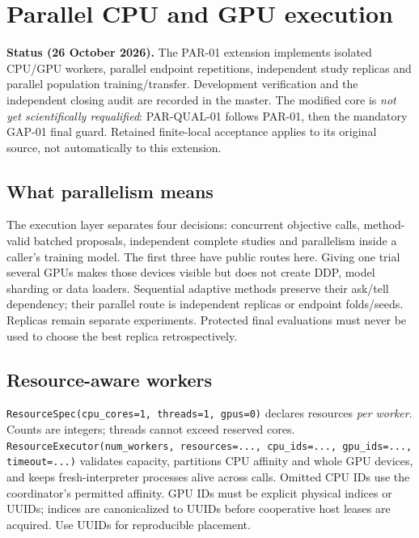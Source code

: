 \chapter{Parallel CPU and GPU execution}
\label{sec:parallel-extension}

\begin{decisions}
\textbf{Status (26 October 2026).} The PAR-01 extension implements isolated
CPU/GPU workers, parallel endpoint repetitions, independent study replicas and
parallel population training/transfer. Development verification and the
independent closing audit are recorded in the master. The modified core is
\emph{not yet scientifically requalified}: PAR-QUAL-01 follows PAR-01, then the
mandatory GAP-01 final guard. Retained finite-local acceptance applies to its
original source, not automatically to this extension.
\end{decisions}

\section{What parallelism means}
The execution layer separates four decisions: concurrent objective calls,
method-valid batched proposals, independent complete studies and parallelism
inside a caller's training model. The first three have public routes here.
Giving one trial several GPUs makes those devices visible but does not create
DDP, model sharding or data loaders. Sequential adaptive methods preserve their
ask/tell dependency; their parallel route is independent replicas or endpoint
folds/seeds. Replicas remain separate experiments. Protected final evaluations
must never be used to choose the best replica retrospectively.

\section{Resource-aware workers}
\texttt{ResourceSpec(cpu\_cores=1, threads=1, gpus=0)} declares resources
\emph{per worker}. Counts are integers; threads cannot exceed reserved cores.
\texttt{ResourceExecutor(num\_workers, resources=..., cpu\_ids=...,
gpu\_ids=..., timeout=...)} validates capacity, partitions CPU affinity and
whole GPU devices, and keeps fresh-interpreter processes alive across calls.
Omitted CPU IDs use the coordinator's permitted affinity. GPU IDs must be
explicit physical indices or UUIDs; indices are canonicalized to UUIDs before
cooperative host leases are acquired. Use UUIDs for reproducible placement.


